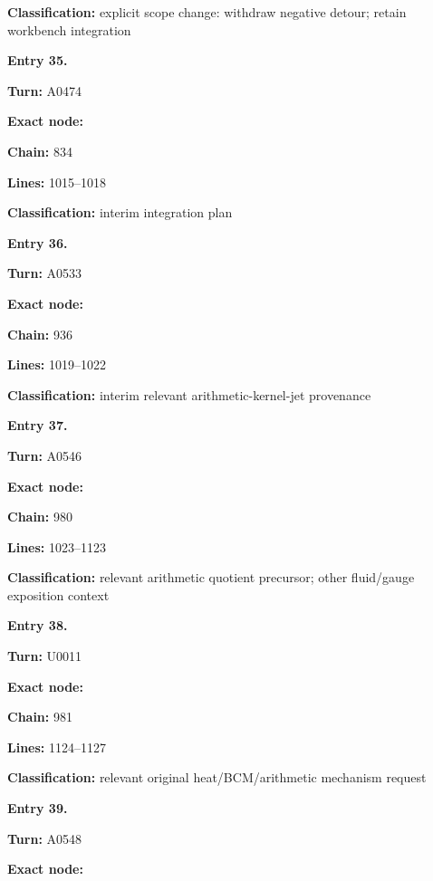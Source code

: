 \textbf{Classification:} explicit scope change: withdraw negative
detour; retain workbench integration


\textbf{Entry 35.}

\textbf{Turn:} A0474

\textbf{Exact node:} \protect{}

\textbf{Chain:} 834

\textbf{Lines:} 1015--1018

\textbf{Classification:} interim integration plan


\textbf{Entry 36.}

\textbf{Turn:} A0533

\textbf{Exact node:} \protect{}

\textbf{Chain:} 936

\textbf{Lines:} 1019--1022

\textbf{Classification:} interim relevant arithmetic-kernel-jet
provenance


\textbf{Entry 37.}

\textbf{Turn:} A0546

\textbf{Exact node:} \protect{}

\textbf{Chain:} 980

\textbf{Lines:} 1023--1123

\textbf{Classification:} relevant arithmetic quotient precursor; other
fluid/gauge exposition context


\textbf{Entry 38.}

\textbf{Turn:} U0011

\textbf{Exact node:} \protect{}

\textbf{Chain:} 981

\textbf{Lines:} 1124--1127

\textbf{Classification:} relevant original heat/BCM/arithmetic mechanism
request


\textbf{Entry 39.}

\textbf{Turn:} A0548

\textbf{Exact node:} \protect{}

